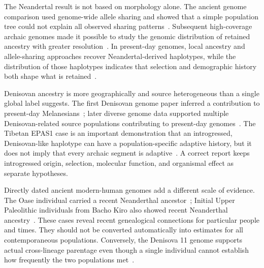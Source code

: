 \documentclass[conference]{IEEEtran}
\begin{document}
The Neandertal result is not based on morphology alone. The ancient genome comparison used genome-wide allele sharing and showed that a simple population tree could not explain all observed sharing patterns~\cite{green2010}. Subsequent high-coverage archaic genomes made it possible to study the genomic distribution of retained ancestry with greater resolution~\cite{prufer2014,meyer2012}. In present-day genomes, local ancestry and allele-sharing approaches recover Neandertal-derived haplotypes, while the distribution of those haplotypes indicates that selection and demographic history both shape what is retained~\cite{vernot2014,sankararaman2014,juric2016}.

Denisovan ancestry is more geographically and source heterogeneous than a single global label suggests. The first Denisovan genome paper inferred a contribution to present-day Melanesians~\cite{reich2010}; later diverse genome data supported multiple Denisovan-related source populations contributing to present-day genomes~\cite{bergstrom2020}. The Tibetan EPAS1 case is an important demonstration that an introgressed, Denisovan-like haplotype can have a population-specific adaptive history, but it does not imply that every archaic segment is adaptive~\cite{huerta2014}. A correct report keeps introgressed origin, selection, molecular function, and organismal effect as separate hypotheses.

Directly dated ancient modern-human genomes add a different scale of evidence. The Oase individual carried a recent Neanderthal ancestor~\cite{fu2015}; Initial Upper Paleolithic individuals from Bacho Kiro also showed recent Neanderthal ancestry~\cite{iasi2021}. These cases reveal recent genealogical connections for particular people and times. They should not be converted automatically into estimates for all contemporaneous populations. Conversely, the Denisova 11 genome supports actual cross-lineage parentage even though a single individual cannot establish how frequently the two populations met~\cite{slon2018}.
\end{document}
